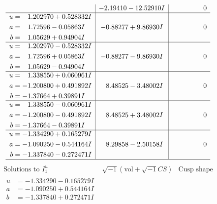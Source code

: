 \documentclass[1p]{elsarticle_modified}
\theoremstyle{definition}
\newcommand{\I}{\sqrt{-1}}
\begin{document}
$$\begin{array}{c|c|c}
 & -2.19410 - 12.52910 I & \phantom{-0.000000 } 0 \\ \hline\begin{aligned}
u &= \phantom{-}1.202970 + 0.528332 I \\
a &= \phantom{-}1.72596 - 0.05863 I \\
b &= \phantom{-}1.05629 + 0.94904 I\end{aligned}
 & -0.88277 + 9.86930 I & \phantom{-0.000000 } 0 \\ \hline\begin{aligned}
u &= \phantom{-}1.202970 - 0.528332 I \\
a &= \phantom{-}1.72596 + 0.05863 I \\
b &= \phantom{-}1.05629 - 0.94904 I\end{aligned}
 & -0.88277 - 9.86930 I & \phantom{-0.000000 } 0 \\ \hline\begin{aligned}
u &= \phantom{-}1.338550 + 0.060961 I \\
a &= -1.200800 + 0.491892 I \\
b &= -1.37664 + 0.39891 I\end{aligned}
 & \phantom{-}8.48525 - 3.48002 I & \phantom{-0.000000 } 0 \\ \hline\begin{aligned}
u &= \phantom{-}1.338550 - 0.060961 I \\
a &= -1.200800 - 0.491892 I \\
b &= -1.37664 - 0.39891 I\end{aligned}
 & \phantom{-}8.48525 + 3.48002 I & \phantom{-0.000000 } 0 \\ \hline\begin{aligned}
u &= -1.334290 + 0.165279 I \\
a &= -1.090250 - 0.544164 I \\
b &= -1.337840 - 0.272471 I\end{aligned}
 & \phantom{-}8.29858 - 2.50158 I & \phantom{-0.000000 } 0\\
 \hline 
 \end{array}$$\newpage$$\begin{array}{c|c|c}  
\text{Solutions to }I^u_{1}& \I (\text{vol} + \sqrt{-1}CS) & \text{Cusp shape}\\
 \hline 
\begin{aligned}
u &= -1.334290 - 0.165279 I \\
a &= -1.090250 + 0.544164 I \\
b &= -1.337840 + 0.272471 I\end{aligned}

\end{array}$$
\end{document}
